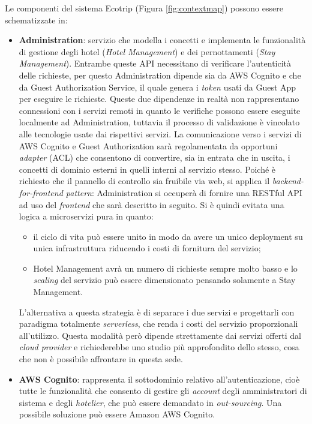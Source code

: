 Le componenti del sistema Ecotrip (Figura \ref{fig:contextmap}) possono essere schematizzate in:
\begin{itemize}
    \item \textbf{Administration}: servizio che modella  i concetti e implementa le funzionalità di gestione degli hotel (\textit{Hotel Management}) e dei pernottamenti (\textit{Stay Management}).  Entrambe queste API necessitano di verificare l'autenticità delle richieste, per questo Administration dipende sia da AWS Cognito e che da Guest Authorization Service, il quale genera i \textit{token} usati da Guest App per eseguire le richieste. Queste due dipendenze in realtà non rappresentano connessioni con i servizi remoti in quanto le verifiche possono essere eseguite localmente ad Administration, tuttavia il processo di validazione è vincolato alle tecnologie usate dai rispettivi servizi. La comunicazione verso i servizi di AWS Cognito e Guest Authorization sarà regolamentata da opportuni \textit{adapter} (ACL) che consentono di convertire, sia in entrata che in uscita, i concetti di dominio esterni in quelli interni al servizio stesso.  
    Poiché è richiesto che il pannello di controllo sia fruibile via web, si applica il \textit{backend-for-frontend pattern}: Administration si occuperà di fornire una RESTful API ad uso del \textit{frontend} che sarà descritto in seguito.
    Si è quindi evitata una logica a microservizi pura in quanto:
    \begin{itemize}
        \item il ciclo di vita può essere unito in modo da avere un unico deployment su unica infrastruttura riducendo i costi di fornitura del servizio;
        \item Hotel Management avrà un numero di richieste sempre molto basso e lo \textit{scaling} del servizio può essere dimensionato pensando solamente a Stay Management.
    \end{itemize}
    L'alternativa a questa strategia è di separare i due servizi e progettarli con paradigma totalmente \textit{serverless}, che renda i costi del servizio proporzionali all'utilizzo. Questa modalità però dipende strettamente dai servizi offerti dal \textit{cloud provider} e richiederebbe uno studio più approfondito dello stesso, cosa che non è possibile affrontare in questa sede.
    \item \textbf{AWS Cognito}: rappresenta il sottodominio relativo all'autenticazione, cioè tutte le funzionalità che consento di gestire gli \textit{account} degli amministratori di sistema e degli \textit{hotelier}, che può essere demandato in \textit{out-sourcing}. Una possibile soluzione può essere Amazon AWS Cognito.

\end{itemize}
